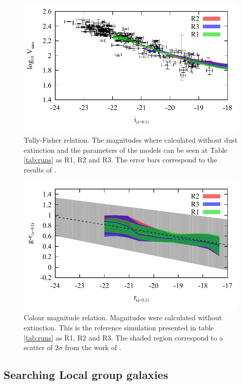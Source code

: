 \documentclass[useAMS,usenatbib]{mn2e}
\begin{document}
\begin{figure}
 \includegraphics[scale=0.68, angle=0]{figures/tests/T_F-disk-velmax.pdf}
\caption{ Tully-Fisher  relation. The magnitudes where calculated
  without dust extinction and the parameters of the models can be seen
  at Table \ref{tab:runs} as R1, R2 and R3. The error bars correspond
  to the results of \citet{2007AJ....134..945P}.}
\label{fig:T-F-diagram}
\end{figure}


\begin{figure}
 \includegraphics[scale=0.68,angle=0]{figures/tests/Color_Mag.pdf}
\caption{ Colour magnitude relation. Magnitudes were calculated without
  extinction. This is the reference simulation presented in table
  \ref{tab:runs} as R1, R2 and R3. The shaded region correspond to a
  scatter of $2\sigma$ from the work of
  \citet{2012MNRAS.423.1583M}.\label{fig:CM-diagram}}
\end{figure}


\subsection{Searching Local group galaxies}
\end{document}
